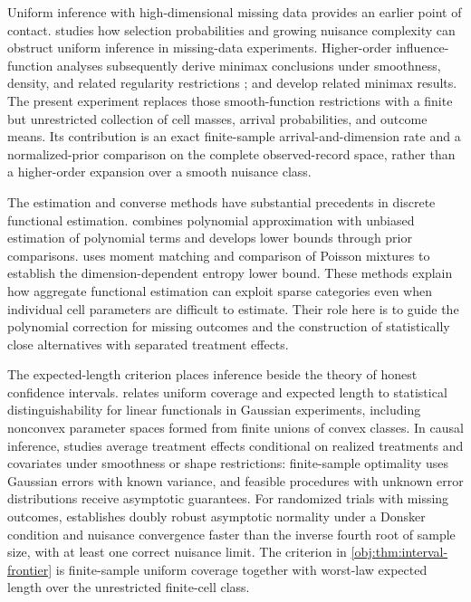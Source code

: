 \documentclass[11pt]{article}
\begin{document}
Uniform inference with high-dimensional missing data provides an earlier point of contact. \citet[pp.~285--319]{Robins1997} studies how selection probabilities and growing nuisance complexity can obstruct uniform inference in missing-data experiments. Higher-order influence-function analyses subsequently derive minimax conclusions under smoothness, density, and related regularity restrictions \citep[pp.~335--421]{Robins2008}; \citet[pp.~1305--1321]{Robins2009} and \citet[pp.~1951--1987]{Robins2017} develop related minimax results. The present experiment replaces those smooth-function restrictions with a finite but unrestricted collection of cell masses, arrival probabilities, and outcome means. Its contribution is an exact finite-sample arrival-and-dimension rate and a normalized-prior comparison on the complete observed-record space, rather than a higher-order expansion over a smooth nuisance class.

The estimation and converse methods have substantial precedents in discrete functional estimation. \citet[Sections~III--IV]{JiaoVenkatHanWeissman2015} combines polynomial approximation with unbiased estimation of polynomial terms and develops lower bounds through prior comparisons. \citet[Proposition~3 and Appendix~B.2]{WuYang2016} uses moment matching and comparison of Poisson mixtures to establish the dimension-dependent entropy lower bound. These methods explain how aggregate functional estimation can exploit sparse categories even when individual cell parameters are difficult to estimate. Their role here is to guide the polynomial correction for missing outcomes and the construction of statistically close alternatives with separated treatment effects.

The expected-length criterion places inference beside the theory of honest confidence intervals. \citet[Theorem~1 and Section~5]{CaiLow2004} relates uniform coverage and expected length to statistical distinguishability for linear functionals in Gaussian experiments, including nonconvex parameter spaces formed from finite unions of convex classes. In causal inference, \citet{Armstrong2021} studies average treatment effects conditional on realized treatments and covariates under smoothness or shape restrictions: finite-sample optimality uses Gaussian errors with known variance, and feasible procedures with unknown error distributions receive asymptotic guarantees. For randomized trials with missing outcomes, \citet[Theorem~2 under Conditions~2--3]{DiazVanDerLaan2017} establishes doubly robust asymptotic normality under a Donsker condition and nuisance convergence faster than the inverse fourth root of sample size, with at least one correct nuisance limit. The criterion in \cref{obj:thm:interval-frontier} is finite-sample uniform coverage together with worst-law expected length over the unrestricted finite-cell class.
\end{document}
